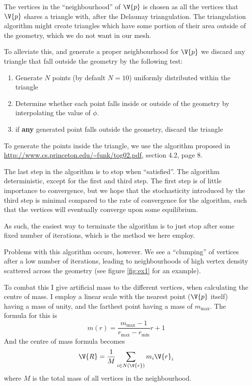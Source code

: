 \documentclass[sigconf]{acmart}
\begin{document}
The vertices in the ``neighbourhood'' of $ \V{p} $ is chosen as all the vertices that $ \V{p} $ shares a triangle with, after the Delaunay triangulation. The triangulation algorithm might create triangles which have some portion of their area outside of the geometry, which we do not want in our mesh.

To alleviate this, and generate a proper neighbourhood for $ \V{p} $ we discard any triangle that fall outside the geometry by the following test:
\begin{enumerate}
	\item Generate $ N $ points (by default $ N = 10 $) uniformly distributed within the triangle
	\item Determine whether each point falls inside or outside of the geometry by interpolating the value of $ \phi $.
	\item if \textbf{any} generated point falls outside the geometry, discard the triangle
\end{enumerate}
To generate the points inside the triangle, we use the algorithm proposed in \url{http://www.cs.princeton.edu/~funk/tog02.pdf}, section 4.2, page 8.

The last step in the algorithm is to stop when  ``satisfied''. The algorithm deterministic, except for the first and third step. The first step is of little importance to convergence, but we hope that the stochasticity introduced by the third step is minimal compared to the rate of convergence for the algorithm, such that the vertices will eventually converge upon some equilibrium.

As such, the easiest way to terminate the algorithm is to just stop after some fixed number of iterations, which is the method we here employ.

Problems with this algorithm occurs, however. We see a ``clumping'' of vertices after a low number of iterations, leading to neighbourhoods of high vertex density scattered across the geometry (see figure \ref{fig:ex1} for an example).

To combat this I give artificial mass to the different vertices, when calculating the centre of mass. I employ a linear scale with the nearest point ($ \V{p} $ itself) having a mass of unity, and the farthest point having a mass of $ m_{\max} $. The formula for this is
\begin{equation}\label{key}
	m(r) = \frac{m_{\max} - 1}{r_{\max} - r_{\min}} r + 1
\end{equation}
And the centre of mass formula becomes
\begin{equation}\label{key}
	\V{R} = \frac{1}{M} \sum_{i \in N(\V{r})} m_i \V{r}_i
\end{equation}
where $ M $ is the total mass of all vertices in the neighbourhood.
\end{document}
